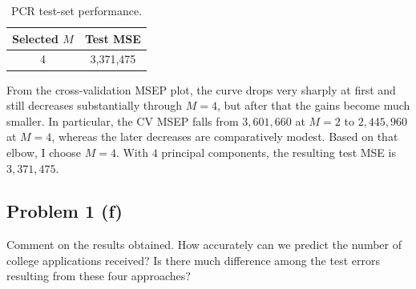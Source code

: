 \documentclass[
  10pt,
]{extarticle}
\begin{document}
\begin{table}[H]
\centering
\caption{\label{tab:unnamed-chunk-8}PCR test-set performance.}
\centering
\begin{tabular}[t]{cc}
\toprule
Selected $M$ & Test MSE\\
\midrule
4 & 3,371,475\\
\bottomrule
\end{tabular}
\end{table}

From the cross-validation MSEP plot, the curve drops very sharply at first and still decreases substantially through \(M=4\), but after that the gains become much smaller. In particular, the CV MSEP falls from \(3{,}601{,}660\) at \(M=2\) to \(2{,}445{,}960\) at \(M=4\), whereas the later decreases are comparatively modest. Based on that elbow, I choose \(\boxed{M = 4}\). With \(4\) principal components, the resulting test MSE is \(\boxed{3{,}371{,}475}\).

\newpage

\subsection{Problem 1 (f)}\label{problem-1-f}

\begin{problem}[Problem 1 (f)]
Comment on the results obtained. How accurately can we predict the number of college applications received? Is there much difference among the test errors resulting from these four approaches?
\end{problem}
\end{document}
